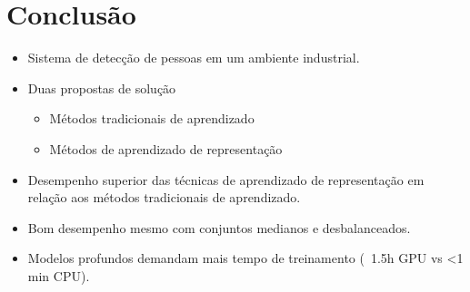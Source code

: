 \section{Conclusão}

\begin{frame}{\insertsection}
	\begin{itemize}
		\item Sistema de detecção de pessoas em um ambiente industrial.
		\item Duas propostas de solução
		\begin{itemize}
			\item Métodos tradicionais de aprendizado
			\item Métodos de aprendizado de representação
		\end{itemize}

		\item Desempenho superior das técnicas de aprendizado de representação em relação aos métodos tradicionais de aprendizado.
		\item Bom desempenho mesmo com conjuntos medianos e desbalanceados.
		\item Modelos profundos demandam mais tempo de treinamento (~1.5h GPU vs <1 min CPU).
	\end{itemize}
\end{frame}
